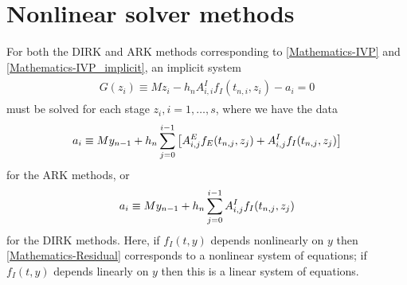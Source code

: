 \documentclass[letterpaper,10pt,english]{sphinxmanual}
\begin{document}
\section{Nonlinear solver methods}
\label{Mathematics:nonlinear-solver-methods}\label{Mathematics:mathematics-nonlinear}
For both the DIRK and ARK methods corresponding to \eqref{Mathematics-IVP} and
\eqref{Mathematics-IVP_implicit}, an implicit system
\label{Mathematics:equation-Residual}\begin{gather}
\begin{split}G(z_i) \equiv M z_i - h_n A^I_{i,i} f_I(t_{n,i}, z_i) - a_i = 0\end{split}\label{Mathematics-Residual}
\end{gather}
must be solved for each stage \(z_i, i=1,\ldots,s\), where we have
the data
\begin{gather}
\begin{split}a_i \equiv M y_{n-1} + h_n \sum_{j=0}^{i-1} \left[
   A^E_{i,j} f_E(t_{n,j}, z_j) +
   A^I_{i,j} f_I(t_{n,j}, z_j) \right]\end{split}\notag
\end{gather}
for the ARK methods, or
\begin{gather}
\begin{split}a_i \equiv M y_{n-1} + h_n \sum_{j=0}^{i-1}
   A^I_{i,j} f_I(t_{n,j}, z_j)\end{split}\notag
\end{gather}
for the DIRK methods.  Here, if \(f_I(t,y)\) depends nonlinearly
on \(y\) then \eqref{Mathematics-Residual} corresponds to a nonlinear system of
equations; if \(f_I(t,y)\) depends linearly on \(y\) then this
is a linear system of equations.
\end{document}

